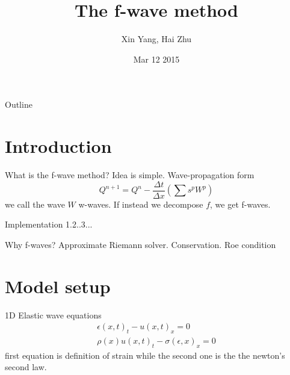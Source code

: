 \documentclass{beamer}
\title%
{The f-wave method }
\author%
{Xin Yang, Hai Zhu}
\institute[University of Washington] %
{
  Course project for Amath 574\\
  Department of Applied Mathematics\\
  University of Washington
}
\date[03/12/2015] %
{Mar 12 2015}
\begin{document}
\begin{frame}
  \titlepage
\end{frame}

\begin{frame}{Outline}
  \tableofcontents
\end{frame}





\section{Introduction}
\begin{frame}{What is the f-wave method?}
Idea is simple.
Wave-propagation form \\
\[
Q^{n+1}=Q^n-\frac{\Delta t}{\Delta x}(\sum s^p W^p)
\]
we call the wave $W$ w-waves. If instead we decompose $f$, we get f-waves.
\end{frame}

\begin{frame}{Implementation}
1.2..3...
\end{frame}

\begin{frame}{Why f-waves?}
Approximate Riemann solver. Conservation. Roe condition
\end{frame}

\section{Model setup}
\begin{frame}{1D Elastic wave equations}
\begin{align}
\epsilon(x,t)_t-u(x,t)_x=0 \label{strain}\\
\rho(x) u(x,t)_t-\sigma(\epsilon,x)_x=0 \label{n2}
\end{align}
first equation is definition of strain while the second one is the the newton's second law.
\end{frame}
\end{document}

